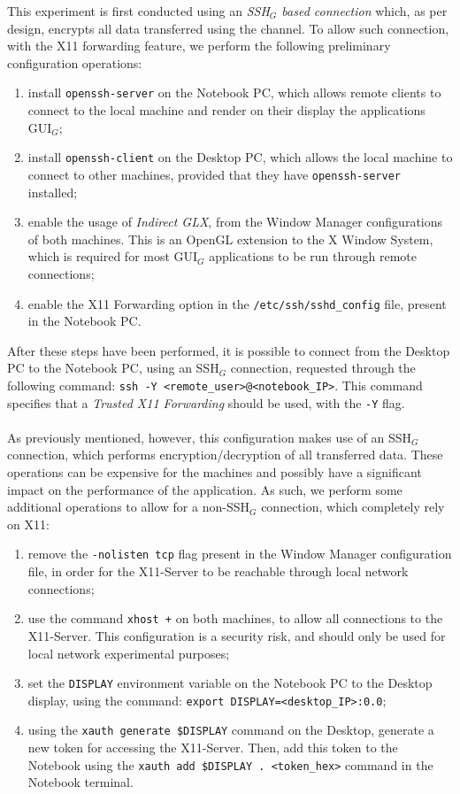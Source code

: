 This experiment is first conducted using an \textit{SSH$_G$ based connection} which, as per design, encrypts all data transferred using the channel. To allow such connection, with the X11 forwarding feature, we perform the following preliminary configuration operations:
\begin{enumerate}
	\item install \texttt{openssh-server} on the Notebook PC, which allows remote clients to connect to the local machine and render on their display the applications GUI$_G$;
	\item install \texttt{openssh-client} on the Desktop PC, which allows the local machine to connect to other machines, provided that they have \texttt{openssh-server} installed;
	\item enable the usage of \textit{Indirect GLX}, from the Window Manager configurations of both machines. This is an OpenGL extension to the X Window System, which is required for most GUI$_G$ applications to be run through remote connections;
	\item enable the X11 Forwarding option in the \texttt{/etc/ssh/sshd\_config} file, present in the Notebook PC.
\end{enumerate}
After these steps have been performed, it is possible to connect from the Desktop PC to the Notebook PC, using an SSH$_G$ connection, requested through the following command: \texttt{ssh -Y <remote\_user>@<notebook\_IP>}. This command specifies that a \textit{Trusted X11 Forwarding} should be used, with the \texttt{-Y} flag. \\ \\
As previously mentioned, however, this configuration makes use of an SSH$_G$ connection, which performs encryption/decryption of all transferred data. These operations can be expensive for the machines and possibly have a significant impact on the performance of the application. As such, we perform some additional operations to allow for a non-SSH$_G$ connection, which completely rely on X11:
\begin{enumerate}
	\item remove the \texttt{-nolisten tcp} flag present in the Window Manager configuration file, in order for the X11-Server to be reachable through local network connections;
	\item use the command \texttt{xhost +} on both machines, to allow all connections to the X11-Server. This configuration is a security risk, and should only be used for local network experimental purposes;
	\item set the \texttt{DISPLAY} environment variable on the Notebook PC to the Desktop display, using the command: \texttt{export DISPLAY=<desktop\_IP>:0.0};
	\item using the \texttt{xauth generate \$DISPLAY} command on the Desktop, generate a new token for accessing the X11-Server. Then, add this token to the Notebook using the \texttt{xauth add \$DISPLAY . <token\_hex>} command in the Notebook terminal.
\end{enumerate}
